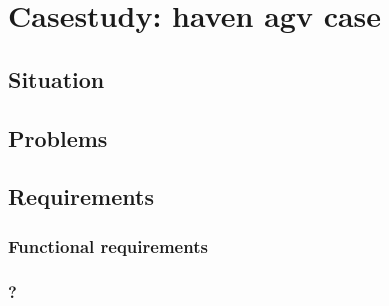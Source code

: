 \chapter{Casestudy: haven agv case}
\section{Situation}

\section{Problems}

\section{Requirements}
\subsection{Functional requirements}
\subsection{?}


\cleardoublepage

